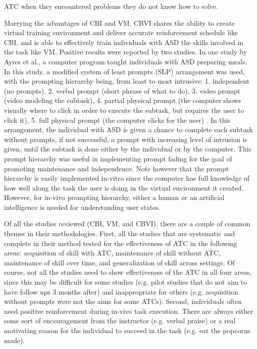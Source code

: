 ATC when they encountered problems they do not know how to solve.

Marrying the advantages of CBI and VM, CBVI shares the ability to create virtual training environment and deliver accurate reinforcement schedule like CBI, and is able to effectively train individuals with ASD the skills involved in the task like VM.  Positive results were reported by two studies.  In one study by Ayres et al., a computer program taught individuals with ASD preparing meals.  In this study, a modified system of least prompts (SLP) arrangement was used, with the prompting hierarchy being, from least to most intrusive: 1. independent (no prompts), 2. verbal prompt (short phrase of what to do), 3. video prompt (video modeling the subtask), 4. partial physical prompt (the computer shows visually where to click in order to execute the subtask, but requires the user to click it), 5. full physical prompt (the computer clicks for the user) \cite{ayres2009acquisition}.  In this arrangement, the individual with ASD is given a chance to complete each subtask without prompts, if not successful, a prompt with increasing level of intrusion is given, until the subtask is done either by the individual or by the computer.  This prompt hierarchy was useful in implementing prompt fading for the goal of promoting maintenance and independence.  Note however that the prompt hierarchy is easily implemented in-vitro since the computer has full knowledge of how well along the task the user is doing in the virtual environment it created.  However, for in-vivo prompting hierarchy, either a human or an artificial intelligence is needed for understanding user states.

Of all the studies reviewed (CBI, VM, and CBVI), there are a couple of common themes in their methodologies.  First, all the studies that are systematic and complete in their method tested for the effectiveness of ATC in the following areas: acquisition of skill with ATC, maintenance of skill without ATC, maintenance of skill over time, and generalization of skill across settings.  Of course, not all the studies need to show effectiveness of the ATC in all four areas, since this may be difficult for some studies (e.g. pilot studies that do not aim to have follow ups 3 months after) and inappropriate for others (e.g. acquisition without prompts were not the aims for some ATCs).  Second, individuals often need positive reinforcement during in-vivo task execution.  There are always either some sort of encouragement from the instructor (e.g. verbal praise) or a real motivating reason for the individual to succeed in the task (e.g. eat the popcorns made).

